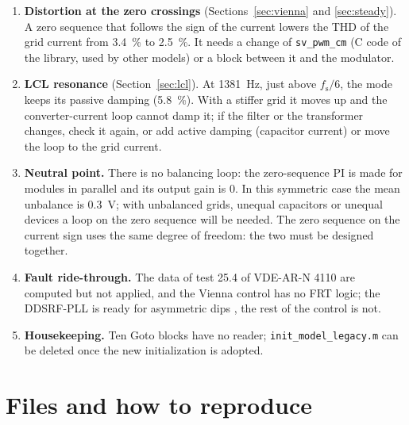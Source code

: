 \documentclass[11pt,a4paper]{scrartcl}
\newcommand{\ped}[1]{_{\mathrm{#1}}}
\newcommand{\code}[1]{\texttt{#1}}
\begin{document}
\begin{onehalfspace}
\begin{enumerate}
	\item \textbf{Distortion at the zero crossings} (Sections~\ref{sec:vienna} and \ref{sec:steady}). A zero sequence that follows the sign of the current lowers the THD of the grid current from \num{3.4}~\% to \num{2.5}~\%. It needs a change of \code{sv\_pwm\_cm} (C code of the library, used by other models) or a block between it and the modulator.
	\item \textbf{LCL resonance} (Section~\ref{sec:lcl}). At \SI{1381}{\hertz}, just above $f\ped{s}/6$, the mode keeps its passive damping (5.8~\%). With a stiffer grid it moves up and the converter-current loop cannot damp it; if the filter or the transformer changes, check it again, or add active damping (capacitor current) or move the loop to the grid current.
	\item \textbf{Neutral point.} There is no balancing loop: the zero-sequence PI is made for modules in parallel and its output gain is 0. In this symmetric case the mean unbalance is \SI{0.3}{\volt}; with unbalanced grids, unequal capacitors or unequal devices a loop on the zero sequence will be needed. The zero sequence on the current sign uses the same degree of freedom: the two must be designed together.
	\item \textbf{Fault ride-through.} The data of test 25.4 of VDE-AR-N 4110 are computed but not applied, and the Vienna control has no FRT logic; the DDSRF-PLL is ready for asymmetric dips \cite{note_pll3}, the rest of the control is not.
	\item \textbf{Housekeeping.} Ten Goto blocks have no reader; \code{init\_model\_legacy.m} can be deleted once the new initialization is adopted.
\end{enumerate}

\section{Files and how to reproduce}
\label{sec:files}


\end{onehalfspace}
\end{document}
